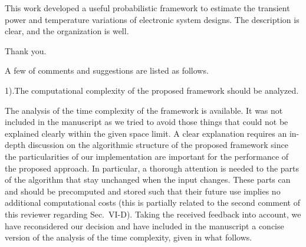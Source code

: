 \begin{reviewer}
This work developed a useful probabilistic framework to estimate the transient power and temperature variations of electronic system designs. The description is clear, and the organization is well.
\end{reviewer}
\begin{authors}
Thank you.
\end{authors}

\begin{reviewer}
A few of comments and suggestions are listed as follows.

1).The computational complexity of the proposed framework should be analyzed.
\end{reviewer}
\begin{authors}
The analysis of the time complexity of the framework is available.
It was not included in the manuscript as we tried to avoid those things that could not be explained clearly within the given space limit.
A clear explanation requires an in-depth discussion on the algorithmic structure of the proposed framework since the particularities of our implementation are important for the performance of the proposed approach.
In particular, a thorough attention is needed to the parts of the algorithm that stay unchanged when the input changes.
These parts can and should be precomputed and stored such that their future use implies no additional computational costs (this is partially related to the second comment of this reviewer regarding Sec.~VI-D).
Taking the received feedback into account, we have reconsidered our decision and have included in the manuscript a concise version of the analysis of the time complexity, given in what follows.


\end{authors}
